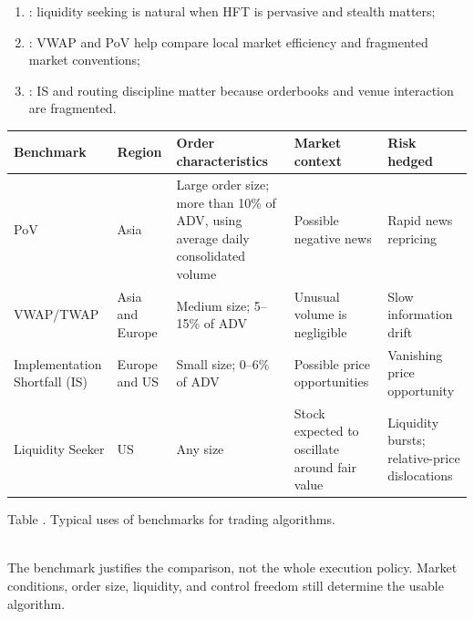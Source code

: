 \documentclass[a4paper,oneside,openany]{book}
\begin{document}
\begin{taxonomy} 
\begin{enumerate}[label=\roman*.]
\setlength{\itemsep}{0pt}
\item {}: liquidity seeking is natural when HFT is pervasive and stealth matters;
\item {}: VWAP and PoV help compare local market efficiency and fragmented market conventions;
\item {}: IS and routing discipline matter because orderbooks and venue interaction are fragmented.
\end{enumerate}
\end{taxonomy}

\begin{table}[htbp]
\centering
\scriptsize
{}
\renewcommand{\arraystretch}{1.12}
\setlength{\tabcolsep}{4pt}
\begin{tabularx}{\textwidth}{@{}>{\RaggedRight\arraybackslash}p{} >{\RaggedRight\arraybackslash}p{} >{\RaggedRight\arraybackslash}p{} >{\RaggedRight\arraybackslash}p{} >{\RaggedRight\arraybackslash}X@{}}
\hline
\textbf{Benchmark} & \textbf{Region} & \textbf{Order characteristics} & \textbf{Market context} & \textbf{Risk hedged} \\
\hline
PoV & Asia & Large order size; more than 10\% of ADV, using average daily consolidated volume & Possible negative news & Rapid news repricing \\
VWAP/TWAP & Asia and Europe & Medium size; 5--15\% of ADV & Unusual volume is negligible & Slow information drift \\
Implementation Shortfall (IS) & Europe and US & Small size; 0--6\% of ADV & Possible price opportunities & Vanishing price opportunity \\
Liquidity Seeker & US & Any size & Stock expected to oscillate around fair value & Liquidity bursts; relative-price dislocations \\
\hline
\end{tabularx}

\vspace{0.25em}
{\footnotesize Table \thetable. Typical uses of benchmarks for trading algorithms.}
\end{table}

\begin{caveat} \\
The benchmark justifies the comparison, not the whole execution policy. Market conditions, order size, liquidity, and control freedom still determine the usable algorithm.
\end{caveat}
\end{document}
